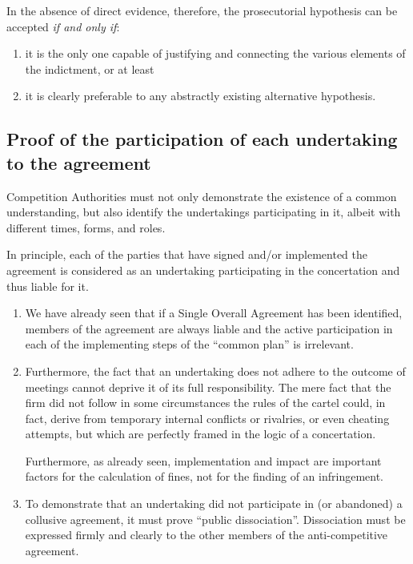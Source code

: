             In the absence of direct evidence, therefore, the prosecutorial hypothesis can be accepted \textit{if and only if}:
            \begin{enumerate}[label=\roman*.]
                \item it is the only one capable of justifying and connecting the various elements of the indictment, or at least
                \item it is clearly preferable to any abstractly existing alternative hypothesis.
            \end{enumerate}

    \subsection{Proof of the participation of each undertaking to the agreement}

        Competition Authorities must not only demonstrate the existence of a common understanding, but also identify the undertakings participating in it, albeit with different times, forms, and roles.

        In principle, each of the parties that have signed and/or implemented the agreement is considered as an undertaking participating in the concertation and thus liable for it.
        \begin{enumerate}
            \item We have already seen that if a Single Overall Agreement has been identified, members of the agreement are always liable and the active participation in each of the implementing steps of the “common plan” is irrelevant.
            \item Furthermore, the fact that an undertaking does not adhere to the outcome of meetings cannot deprive it of its full responsibility. The mere fact that the firm did not follow in some circumstances the rules of the cartel could, in fact, derive from temporary internal conflicts or rivalries, or even cheating attempts, but which are perfectly framed in the logic of a concertation.
        
            Furthermore, as already seen, implementation and impact are important factors for the calculation of fines, not for the finding of an infringement.
            \item To demonstrate that an undertaking did not participate in (or abandoned) a collusive agreement, it must prove ``public dissociation''. Dissociation must be expressed firmly and clearly to the other members of the anti-competitive agreement.
        \end{enumerate}

